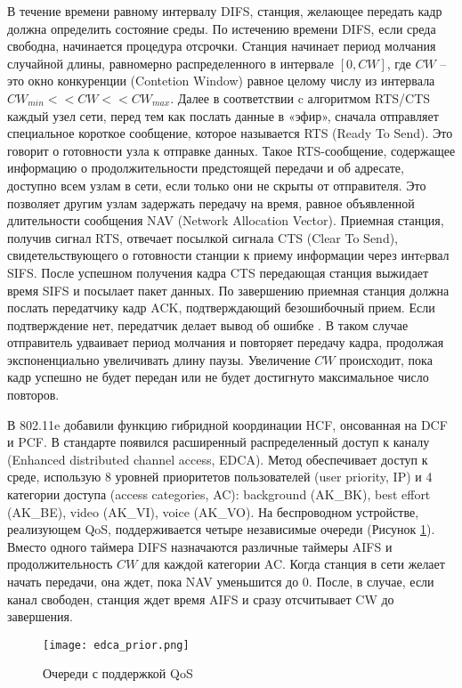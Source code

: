 В течение времени равному интервалу DIFS, станция, желающее передать кадр должна определить состояние среды. По истечению времени DIFS, если среда свободна, начинается процедура отсрочки. Станция начинает период молчания случайной длины, равномерно распределенного в интервале $[0, CW]$, где $CW$ -- это окно конкуренции (Contetion Window) равное целому числу из интервала $CW_{min} << CW << CW_{max}$. Далее в соответствии c алгоритмом RTS/CTS каждый узел сети, перед тем как послать данные в «эфир», сначала отправляет специальное короткое сообщение, которое называется RTS (Ready To Send). Это говорит о готовности узла к отправке данных. Такое RTS-сообщение, содержащее информацию о продолжительности предстоящей передачи и об адресате, доступно всем узлам в сети, если только они не скрыты от отправителя. Это позволяет другим узлам задержать передачу на время, равное объявленной длительности сообщения NAV (Network Allocation Vector). Приемная станция, получив сигнал RTS, отвечает посылкой сигнала CTS (Clear To Send), свидетельствующего о готовности станции к приему информации через интeрвал SIFS. После успешном получения кадра CTS передающая станция выжидает время SIFS и посылает пакет данных. По завершению приемная станция должна послать передатчику кадр ACK, подтверждающий безошибочный прием. Если подтверждение нет, передатчик делает вывод об ошибке \cite{Tanenbaum2022}. В таком случае отправитель удваивает период молчания и повторяет передачу кадра, продолжая экспоненциально увеличивать длину паузы. Увеличение $CW$ происходит, пока кадр успешно не будет передан или не будет достигнуто максимальное число повторов.


В 802.11e добавили функцию гибридной координации HCF, онсованная на DCF и PCF. В стандарте появился расширенный распределенный доступ к каналу (Enhanced distributed channel access, EDCA).  Метод обеспечивает доступ к среде, использую 8 уровней приоритетов пользователей (user priority, IP) и 4 категории доступа (access categories, AC): background (AK\_BK), best effort (AK\_BE), video (AK\_VI), voice (AK\_VO). На беспроводном устройстве, реализующем QoS, поддерживается четыре независимые очереди (Рисунок \cref{fig:part1_edca_prior}). Вместо одного таймера DIFS назначаются различные таймеры AIFS и продолжительность $CW$ для каждой категории AC. Когда станция в сети желает начать передачи, она ждет, пока NAV уменьшится до 0. После, в случае, если канал свободен, станция ждет время AIFS и сразу отсчитывает CW до завершения.

\begin{figure}[h!]
  \centering
   \texttt{[image: edca\_prior.png]}
\caption{Очереди с поддержкой QoS}
\label{fig:part1_edca_prior}
\end{figure}



